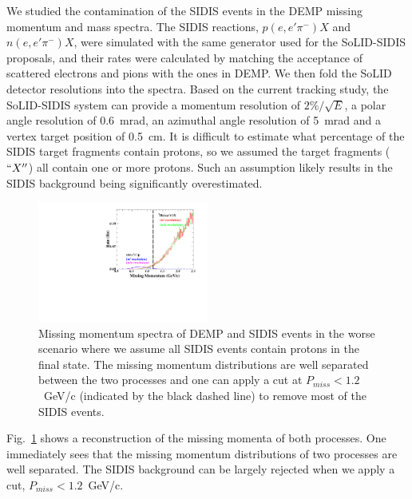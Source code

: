 We studied the contamination of the SIDIS events in the DEMP missing momentum
and mass spectra. The SIDIS reactions, $p(e,e'\pi^{-})X$ and $n(e,e'\pi^{-})X$,
were simulated with the same generator used for the SoLID-SIDIS proposals, and
their rates were calculated by matching the acceptance of scattered electrons
and pions with the ones in DEMP. We then fold the SoLID detector resolutions
into the spectra. Based on the current tracking study, the SoLID-SIDIS system
can provide a momentum resolution of $2\%/\sqrt{E}$, a polar angle
resolution of 0.6~mrad, an azimuthal angle resolution of 5~mrad and a
vertex target position of 0.5~cm. It is difficult to estimate what
percentage of the SIDIS target fragments contain protons, so we assumed
the target fragments ($``X''$) all contain one or more protons. Such an
assumption likely results in the SIDIS background being significantly
overestimated.

\begin{figure}[!ht]
\begin{center}
\includegraphics[type=pdf,ext=.pdf,read=.pdf,width=0.5\textwidth]
{./figures/Missing_P_Fermi_Rad_023Hz}
\caption[Missing Momentum]{\footnotesize{Missing momentum spectra of DEMP and
SIDIS events in the worse scenario where we assume all SIDIS events contain protons in the final state. 
The missing momentum distributions are well separated between the
two processes and one can apply a cut at $P_{miss}<1.2$~GeV/c (indicated by the
black dashed line) to remove most of the SIDIS events. }}
  \label{missing_mom}
  \end{center}
\end{figure}

Fig.~\ref{missing_mom} shows a reconstruction of the missing momenta of both
processes. One immediately sees that the missing momentum distributions of two
processes are well separated.  The SIDIS background can be largely rejected
when we apply a cut, $P_{miss}<1.2$~GeV/c.

